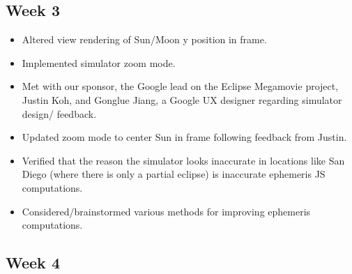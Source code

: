 \documentclass[10pt, onecolumn, draftclsnofoot, letterpaper, compsoc]{IEEEtran}
\begin{document}
\subsection{Week 3}

    \begin{itemize}

    \item Altered view rendering of Sun/Moon y position in frame.

	\item Implemented simulator zoom mode.

	\item Met with our sponsor, the Google lead on the Eclipse Megamovie project,
		  Justin Koh, and Gonglue Jiang, a Google UX designer regarding simulator design/
		  feedback.

	\item Updated zoom mode to center Sun in frame following feedback from Justin.

	\item Verified that the reason the simulator looks inaccurate in locations like San
		  Diego (where there is only a partial eclipse) is inaccurate ephemeris JS
		  computations.

	\item Considered/brainstormed various methods for improving ephemeris computations.

    \end{itemize}

\subsection{Week 4}
\end{document}
